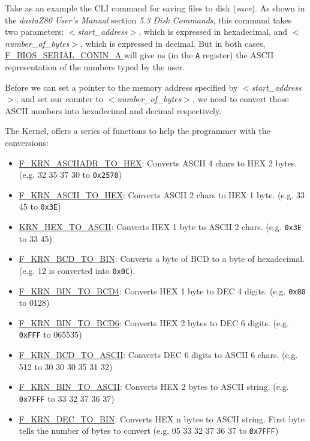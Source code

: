    Take as an example the CLI command for saving files to disk (\textit{save}).
    As shown in the \textit{dastaZ80 User's Manual} section \textit{5.3 Disk
    Commands}, this command takes two parameters: \textit{$<$start\_address$>$},
    which is expressed in hexadecimal, and \textit{$<$number\_of\_bytes$>$}, which
    is expressed in decimal. But in both cases,
    \hyperref[func:fbiosserialconina]{F\_BIOS\_SERIAL\_CONIN\_A } will give
    us (in the \texttt{A} register) the ASCII representation of the numbers typed
    by the user.

    Before we can set a pointer to the memory address specified by 
    \textit{$<$start\_address$>$}, and set our counter to 
    \textit{$<$number\_of\_bytes$>$}, we need to convert those ASCII numbers
    into hexadecimal and decimal respectively.

    The Kernel, offers a series of functions to help the programmer with the
    conversions:

    \begin{itemize}
        \item \hyperref[func:fkrnasciiadrtohex]{F\_KRN\_ASCIIADR\_TO\_HEX}:
        Converts ASCII 4 chars to HEX 2 bytes. (e.g. 32 35 37 30 to \texttt{0x2570})
        \item \hyperref[func:fkrnasciitohex]{F\_KRN\_ASCII\_TO\_HEX}: Converts
        ASCII 2 chars to HEX 1 byte. (e.g. 33 45 to \texttt{0x3E})
        \item \hyperref[func:fkrnhextoascii]{KRN\_HEX\_TO\_ASCII}: Converts
        HEX 1 byte to ASCII 2 chars. (e.g. \texttt{0x3E} to 33 45)
        \item \hyperref[func:fkrnbcdtobin]{F\_KRN\_BCD\_TO\_BIN}: Converts a
        byte of BCD to a byte of hexadecimal. (e.g. 12 is converted into \texttt{0x0C}).
        \item \hyperref[func:fkrnbintobcd4]{F\_KRN\_BIN\_TO\_BCD4}: Converts HEX
        1 byte to DEC 4 digits. (e.g. \texttt{0x80} to 0128)
        \item \hyperref[func:fkrnbintobcd6]{F\_KRN\_BIN\_TO\_BCD6}: Converts HEX
        2 bytes to DEC 6 digits. (e.g. \texttt{0xFFF} to 065535)
        \item \hyperref[func:fkrnbcdtoascii]{F\_KRN\_BCD\_TO\_ASCII}: Converts
        DEC 6 digits to ASCII 6 chars. (e.g. 512 to 30 30 30 35 31 32)
        \item \hyperref[func:fkrnbintoascii]{F\_KRN\_BIN\_TO\_ASCII}: Converts
        HEX 2 bytes to ASCII string. (e.g. \texttt{0x7FFF} to 33 32 37 36 37)
        \item \hyperref[func:fkrndectobin]{F\_KRN\_DEC\_TO\_BIN}:
        Converts HEX n bytes to ASCII string. First byte tells the number of
        bytes to convert (e.g. 05 33 32 37 36 37 to \texttt{0x7FFF})
    \end{itemize}

